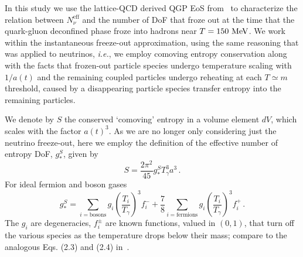 In this study we use the  lattice-QCD derived QGP EoS from~\cite{Borsanyi:2013bia} to characterize the relation between $N^{\text{eff}}_{\nu}$ and the number of DoF that froze out at the time that the quark-gluon deconfined phase froze into hadrons near $T=150\text{ MeV}$.  We work within the instantaneous freeze-out approximation, using the same reasoning that was applied to neutrinos, {\it i.e.\/}, we employ comoving entropy conservation along with the facts that   frozen-out particle species undergo temperature scaling with $1/a(t)$  and the remaining coupled particles undergo reheating  at each $T\simeq m$ threshold, caused by a disappearing particle species transfer  entropy   into the remaining  particles.



We denote by $S$ the conserved `comoving' entropy in a volume element $dV$, which scales with the factor $a(t)^3$. As we are no longer only considering just the neutrino freeze-out, here we employ the definition of the effective number of entropy DoF, $g_*^S$, given by
\begin{equation}
S=\frac{2\pi^2}{45}g^S_*T_\gamma^3 a^3\,.
\end{equation} 
For ideal fermion and boson gases
\begin{equation}
g_*^S=\!\!\!\!\sum_{i=\text{bosons}}\!\!\!\!g_i \left(\frac{T_i}{T_\gamma}\right)^3\!\!\!f_i^-+\frac{7}{8}\!\!\!\sum_{i=\text{fermions}}\!\!\!\! g_i \left(\frac{T_i}{T_\gamma}\right)^3\!\!\!f_i^+\,.
\end{equation}
The $g_i$ are degeneracies, $f_i^\pm$ are known functions, valued in $(0,1)$, that turn off the various species as the temperature drops below their mass; compare to the analogous Eqs. (2.3) and (2.4) in~\cite{Blennow:2012de}. 


